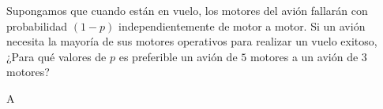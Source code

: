 	\question
		Supongamos que cuando están en vuelo, los motores del avión fallarán con probabilidad $(1-p)$ independientemente de motor a motor. Si un avión necesita la mayoría de sus motores operativos para realizar un vuelo exitoso, ¿Para qué valores de $p$ es preferible un avión de $5$ motores a un avión de $3$ motores?
		
	\begin{solutionorbox}
		A
	\end{solutionorbox}